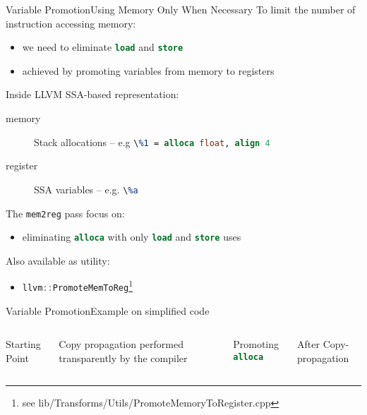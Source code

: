 \documentclass[10pt,mathserif]{beamer}
\newcommand{\cppinline}[1]{\lstinline[language=C++]!#1!}
\newcommand{\llvminput}[1]{}
\newcommand{\llvminline}[1]{\lstinline[language=LLVM]!#1!}
\begin{document}
\begin{frame}{Variable Promotion}{Using Memory Only When Necessary}
To limit the number of instruction accessing memory:

\begin{itemize}
\item we need to eliminate \llvminline{load} and \llvminline{store}
\item achieved by \alert{promoting} variables from memory to registers
\end{itemize}

\vfill
Inside LLVM SSA-based representation:

\begin{description}
\item[memory] Stack allocations --
              e.g \llvminline{\%1 = alloca float, align 4}
\item[register] SSA variables -- e.g. \llvminline{\%a}
\end{description}

\vfill
The \texttt{mem2reg} pass focus on:

\begin{itemize}
\item eliminating \llvminline{alloca} with only \llvminline{load} and
      \llvminline{store} uses
\end{itemize}

Also available as utility:

\begin{itemize}
\item \cppinline{llvm::PromoteMemToReg}\footnote{see lib/Transforms/Utils/PromoteMemoryToRegister.cpp}
\end{itemize}
\end{frame}

\begin{frame}{Variable Promotion}{Example on simplified code}
\begin{columns}[t]
\begin{block}{Starting Point}
\centering
\llvminput{snippet/02/saxpy.ll}
\end{block}

Copy propagation performed transparently by the compiler

\begin{block}{Promoting \llvminline{alloca}}
\centering
\llvminput{snippet/02/mem2reg-saxpy.ll}
\end{block}

\begin{block}{After Copy-propagation}
\centering
\llvminput{snippet/02/mem2reg-copy-saxpy.ll}
\end{block}

\end{columns}
\end{frame}
\end{document}

